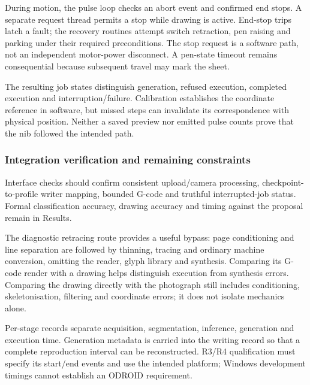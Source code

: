 During motion, the pulse loop checks an abort event and confirmed end stops. A separate request thread permits a stop while drawing is active. End-stop trips latch a fault; the recovery routines attempt switch retraction, pen raising and parking under their required preconditions. The stop request is a software path, not an independent motor-power disconnect. A pen-state timeout remains consequential because subsequent travel may mark the sheet.

The resulting job states distinguish generation, refused execution, completed execution and interruption/failure. Calibration establishes the coordinate reference in software, but missed steps can invalidate its correspondence with physical position. Neither a saved preview nor emitted pulse counts prove that the nib followed the intended path.

\subsubsection{Integration verification and remaining constraints}
Interface checks should confirm consistent upload/camera processing, checkpoint-to-profile writer mapping, bounded G-code and truthful interrupted-job status. Formal classification accuracy, drawing accuracy and timing against the proposal remain in Results.

The diagnostic retracing route provides a useful bypass: page conditioning and line separation are followed by thinning, tracing and ordinary machine conversion, omitting the reader, glyph library and synthesis. Comparing its G-code render with a drawing helps distinguish execution from synthesis errors. Comparing the drawing directly with the photograph still includes conditioning, skeletonisation, filtering and coordinate errors; it does not isolate mechanics alone.

Per-stage records separate acquisition, segmentation, inference, generation and execution time. Generation metadata is carried into the writing record so that a complete reproduction interval can be reconstructed. R3/R4 qualification must specify its start/end events and use the intended platform; Windows development timings cannot establish an ODROID requirement.
\FloatBarrier
